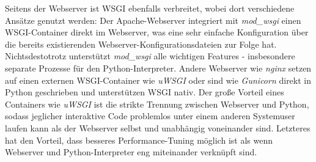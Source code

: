 Seitens der Webserver ist WSGI ebenfalls verbreitet, wobei dort verschiedene Ansätze genutzt werden:
Der Apache-Webserver integriert mit \emph{mod\_wsgi} einen WSGI-Container direkt im Webserver, was
eine sehr einfache Konfiguration über die bereits existierenden Webserver-Konfigurationsdateien zur
Folge hat. Nichtsdestotrotz unterstützt \emph{mod\_wsgi} alle wichtigen Features - insbesondere
separate Prozesse für den Python-Interpreter.
Andere Webserver wie \emph{nginx} setzen auf einen externen WSGI-Container wie \emph{uWSGI} oder
sind wie \emph{Gunicorn} direkt in Python geschrieben und unterstützen WSGI nativ.
Der große Vorteil eines Containers wie \emph{uWSGI} ist die strikte Trennung zwischen Webserver und
Python, sodass jeglicher interaktive Code problemlos unter einem anderen Systemuser laufen kann als
der Webserver selbst und unabhängig voneinander sind. Letzteres hat den Vorteil, dass besseres
Performance-Tuning möglich ist als wenn Webserver und Python-Interpreter eng miteinander verknüpft
sind.

